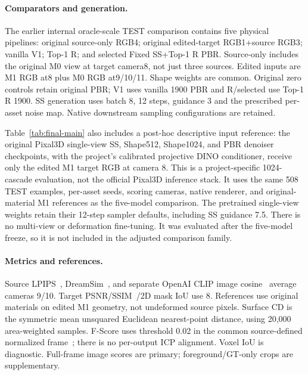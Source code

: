 \paragraph{Comparators and generation.}
The earlier internal oracle-scale TEST comparison contains five physical pipelines: original
source-only RGB4; original edited-target RGB1+source RGB3; vanilla V1;
Top-1 R; and selected Fixed SS+Top-1 R PBR. Source-only includes the original
M0 view at target camera8, not just three sources. Edited inputs are M1 RGB
at8 plus M0 RGB at9/10/11. Shape weights are common. Original zero controls
retain original PBR; V1 uses vanilla 1900 PBR and R/selected use Top-1 R 1900.
SS generation uses batch 8, 12 steps, guidance 3 and the prescribed per-asset
noise map. Native downstream sampling configurations are retained.

Table~\ref{tab:final-main} also includes a post-hoc descriptive input
reference: the original Pixal3D single-view SS, Shape512, Shape1024, and PBR
denoiser checkpoints, with the project's calibrated projective DINO
conditioner, receive only the edited M1 target RGB at camera 8. This is a
project-specific 1024-cascade evaluation, not the official Pixal3D inference
stack. It uses the same 508 TEST examples, per-asset seeds, scoring cameras,
native renderer, and original-material M1 references as the five-model
comparison. The pretrained single-view weights retain their 12-step sampler
defaults, including SS guidance 7.5. There is no multi-view or deformation
fine-tuning. It was evaluated after the five-model freeze, so it is not
included in the adjusted comparison family.

\paragraph{Metrics and references.}
Source LPIPS~\cite{zhang2018lpips}, DreamSim~\cite{fu2023dreamsim}, and separate
OpenAI CLIP image cosine~\cite{radford2021clip} average cameras 9/10. Target
PSNR/SSIM~\cite{wang2004ssim}/2D mask IoU use 8. References use original
materials on edited M1 geometry, not undeformed source pixels. Surface CD
is the symmetric mean unsquared Euclidean nearest-point distance, using
20,000 area-weighted samples. F-Score uses threshold 0.02 in the common
source-defined normalized frame~\cite{tatarchenko2019surface}; there is no
per-output ICP alignment. Voxel IoU is diagnostic. Full-frame image scores
are primary; foreground/GT-only crops are supplementary.

